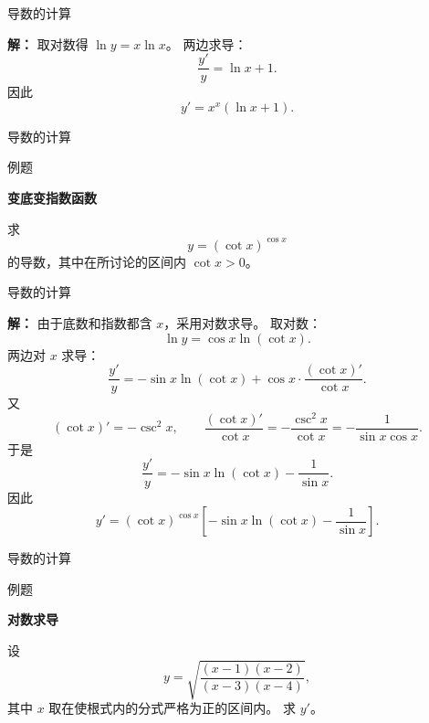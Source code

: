 \documentclass[aspectratio=169,10pt,fontset=fandol]{ctexbeamer}
\newenvironment{warning}{\par\noindent\textbf{注：}\quad}{\par\vspace{0.8em}}
\begin{document}
\begin{frame}[t,fragile]{导数的计算}
\footnotesize
{\footnotesize
\textbf{解：}
取对数得 $\ln y=x\ln x$。 两边求导：
	\[
	\frac{y'}{y}=\ln x+1.
	\]
	因此
	\[
	y'=x^x(\ln x+1).
	\]

}
\end{frame}
\begin{frame}[t,fragile]{导数的计算}
\footnotesize
\begin{block}{例题}
{\footnotesize
\textbf{变底变指数函数}\par

	求
	\[
	y=(\cot x)^{\cos x}
	\]
	的导数，其中在所讨论的区间内 $\cot x>0$。

}
\end{block}
\end{frame}
\begin{frame}[t,fragile]{导数的计算}
\footnotesize
{\footnotesize
\textbf{解：}
由于底数和指数都含 $x$，采用对数求导。 取对数：
	\[
	\ln y=\cos x\ln(\cot x).
	\]
	两边对 $x$ 求导：
	\[
	\frac{y'}{y}
	=-\sin x\ln(\cot x)+\cos x\cdot\frac{(\cot x)'}{\cot x}.
	\]
	又
	\[
	(\cot x)'=-\csc^2x,\qquad
	\frac{(\cot x)'}{\cot x}
	=-\frac{\csc^2x}{\cot x}
	=-\frac{1}{\sin x\cos x}.
	\]
	于是
	\[
	\frac{y'}{y}
	=-\sin x\ln(\cot x)-\frac1{\sin x}.
	\]
	因此
	\[
	y'=(\cot x)^{\cos x}\left[-\sin x\ln(\cot x)-\frac1{\sin x}\right].
	\]

}
\end{frame}
\begin{frame}[t,fragile]{导数的计算}
\footnotesize
\begin{block}{例题}
{\footnotesize
\textbf{对数求导}\par

	设
	\[
	y=\sqrt{\frac{(x-1)(x-2)}{(x-3)(x-4)}},
	\]
	其中 $x$ 取在使根式内的分式严格为正的区间内。 求 $y'$。

}
\end{block}
\end{frame}
\end{document}
